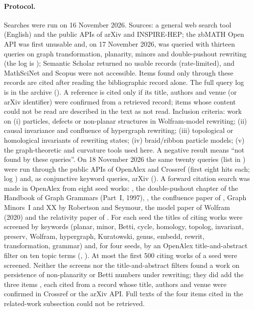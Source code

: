 \documentclass[10pt]{article}
\theoremstyle{definition}
\theoremstyle{plain}
\theoremstyle{remark}
\begin{document}
\paragraph{Protocol.} Searches were run on 16 November 2026. Sources: a general web search tool (English) and the public APIs of arXiv and INSPIRE-HEP; the zbMATH Open API was first unusable and, on 17 November 2026, was queried with thirteen queries on graph transformation, planarity, minors and double-pushout rewriting (the log is ); Semantic Scholar returned no usable records (rate-limited), and MathSciNet and Scopus were not accessible. Items found only through these records are cited after reading the bibliographic record alone. The full query log is in the archive (). A reference is cited only if its title, authors and venue (or arXiv identifier) were confirmed from a retrieved record; items whose content could not be read are described in the text as not read. Inclusion criteria: work on (i) particles, defects or non-planar structures in Wolfram-model rewriting; (ii) causal invariance and confluence of hypergraph rewriting; (iii) topological or homological invariants of rewriting states; (iv) braid/ribbon particle models; (v) the graph-theoretic and curvature tools used here. A negative result means ``not found by these queries''. On 18 November 2026 the same twenty queries (list in ) were run through the public APIs of OpenAlex and Crossref (first eight hits each; log ) and, as conjunctive keyword queries, arXiv (). A forward citation search was made in OpenAlex from eight seed works: \citet{habel2001dpo}, the double-pushout chapter of the Handbook of Graph Grammars (Part~I, 1997), \citet{ehrig2006}, the confluence paper of \citet{plump2005}, Graph Minors~I and XX by Robertson and Seymour, the model paper of Wolfram (2020) and the relativity paper of \citet{gorard2020relativistic}. For each seed the titles of citing works were screened by keywords (planar, minor, Betti, cycle, homology, topolog, invariant, preserv, Wolfram, hypergraph, Kuratowski, genus, embedd, rewrit, transformation, grammar) and, for four seeds, by an OpenAlex title-and-abstract filter on ten topic terms (, ). At most the first 500 citing works of a seed were screened. Neither the screens nor the title-and-abstract filters found a work on persistence of non-planarity or Betti numbers under rewriting; they did add the three items \citet{llabres1997dpo,pascual2022topological,arrighi2012causal}, each cited from a record whose title, authors and venue were confirmed in Crossref or the arXiv API. Full texts of the four items cited in the related-work subsection could not be retrieved. 
\end{document}
